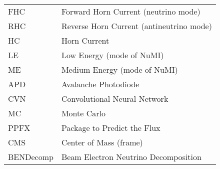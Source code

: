 \documentclass[12pt,a4paper]{report}
\let\openright=\clearpage
\begin{document}
\begin{table}[H]
\begin{tabular}{ll}
FHC        & Forward Horn Current (neutrino mode)              \\
RHC        & Reverse Horn Current (antineutrino mode)          \\
HC         & Horn Current                                      \\
LE         & Low Energy (mode of NuMI)                         \\
ME         & Medium Energy (mode of NuMI)                      \\
APD        & Avalanche Photodiode                              \\
CVN        & Convolutional Neural Network                      \\
MC         & Monte Carlo                                       \\
PPFX       & Package to Predict the Flux                       \\
CMS        & Center of Mass (frame)                            \\
BENDecomp  & Beam Electron Neutrino Decomposition              
\end{tabular}
\end{table}









%



\appendix


\openright
\end{document}
